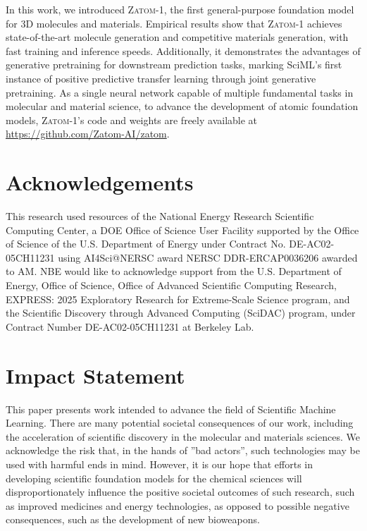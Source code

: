\documentclass{article}
\theoremstyle{plain}
\theoremstyle{definition}
\theoremstyle{remark}
\begin{document}
In this work, we introduced \textsc{Zatom-1}, the first general-purpose foundation model for 3D molecules and materials. Empirical results show that \textsc{Zatom-1} achieves state-of-the-art molecule generation and competitive materials generation, with fast training and inference speeds. Additionally, it demonstrates the advantages of generative pretraining for downstream prediction tasks, marking SciML's first instance of positive predictive transfer learning through joint generative pretraining. As a single neural network capable of multiple fundamental tasks in molecular and material science, to advance the development of atomic foundation models, \textsc{Zatom-1}'s code and weights are freely available at \url{https://github.com/Zatom-AI/zatom}.

\section*{Acknowledgements}

This research used resources of the National Energy Research Scientific Computing Center, a DOE Office of Science User Facility supported by the Office of Science of the U.S. Department of Energy under Contract No. DE-AC02-05CH11231 using AI4Sci@NERSC award NERSC DDR-ERCAP0036206 awarded to AM. NBE would like to acknowledge support from the U.S. Department of Energy, Office of Science, Office of Advanced Scientific Computing Research, EXPRESS: 2025 Exploratory Research for Extreme-Scale Science program, and the Scientific Discovery through Advanced Computing (SciDAC) program, under Contract Number DE-AC02-05CH11231 at Berkeley Lab.

\section*{Impact Statement}

This paper presents work intended to advance the field of Scientific Machine Learning. There are many potential societal consequences of our work, including the acceleration of scientific discovery in the molecular and materials sciences. We acknowledge the risk that, in the hands of ”bad actors”, such technologies may be used with harmful ends in mind. However, it is our hope that efforts in developing scientific foundation models for the chemical sciences will disproportionately influence the positive societal outcomes of such research, such as improved medicines and energy technologies, as opposed to possible negative consequences, such as the development of new bioweapons.
\end{document}
